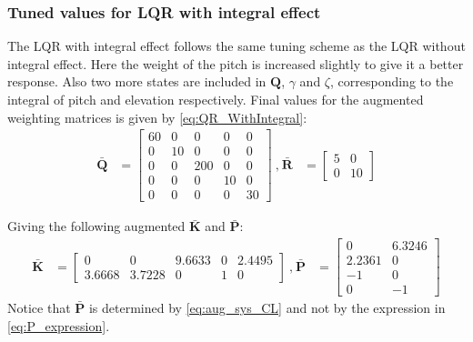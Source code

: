 \subsubsection{Tuned values for LQR with integral effect}
The LQR with integral effect follows the same tuning scheme as the LQR without integral effect. Here the weight of the pitch is increased slightly to give it a better response. Also two more states are included in $\mathbf{Q}$, $\gamma$ and $\zeta$, corresponding to the integral of pitch and elevation respectively. Final values for the augmented weighting matrices is given by \cref{eq:QR_WithIntegral}:
\begin{equation}\label{eq:QR_WithIntegral}
    \begin{aligned}
        \mathbf{\bar{Q}} &=
        \begin{bmatrix}
            60 & 0 & 0 & 0 & 0 \\
            0 & 10 & 0 & 0 & 0 \\
            0 & 0 & 200 & 0 & 0 \\
            0 & 0 & 0 & 10 & 0 \\
            0 & 0 & 0 & 0 & 30 
        \end{bmatrix}
        \: \textrm{,} \:
        \mathbf{\bar{R}} &=
        \begin{bmatrix}
            5 & 0 \\
            0 & 10 
        \end{bmatrix}
    \end{aligned}
\end{equation}

Giving the following augmented $\mathbf{\bar{K}}$ and $\mathbf{\bar{P}}$:
\begin{equation}\label{eq:K_WithIntegral}
    \begin{aligned}
        \mathbf{\bar{K}} &=
        \begin{bmatrix}
            0 & 0 & 9.6633 & 0  & 2.4495\\
            3.6668 & 3.7228 & 0 & 1 &  0
        \end{bmatrix}
        \: \textrm{,} \:
        \mathbf{\bar{P}} &=
        \begin{bmatrix}
            0 & 6.3246 \\
            2.2361 & 0 \\
            -1 & 0 \\
            0 & -1
        \end{bmatrix}
    \end{aligned}
\end{equation}
Notice that $\mathbf{\bar{P}}$ is determined by \cref{eq:aug_sys_CL} and not by the expression in \cref{eq:P_expression}.

